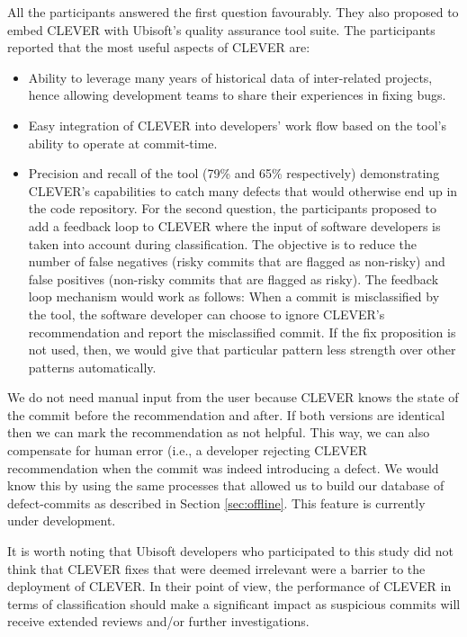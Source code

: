 \documentclass[sigconf]{acmart}
\providecommand{\tightlist}{%
  \setlength{\itemsep}{0pt}\setlength{\parskip}{0pt}}
\begin{document}
All the participants answered the first question favourably. They also
proposed to embed CLEVER with Ubisoft's quality assurance tool suite.
The participants reported that the most useful aspects of CLEVER are:

\begin{itemize}
\tightlist
\item
  Ability to leverage many years of historical data of inter-related
  projects, hence allowing development teams to share their experiences
  in fixing bugs.
\item
  Easy integration of CLEVER into developers' work flow based on the
  tool's ability to operate at commit-time.\\
\item
  Precision and recall of the tool (79\% and 65\% respectively)
  demonstrating CLEVER's capabilities to catch many defects that would
  otherwise end up in the code repository. For the second question, the
  participants proposed to add a feedback loop to CLEVER where the input
  of software developers is taken into account during classification.
  The objective is to reduce the number of false negatives (risky
  commits that are flagged as non-risky) and false positives (non-risky
  commits that are flagged as risky). The feedback loop mechanism would
  work as follows: When a commit is misclassified by the tool, the
  software developer can choose to ignore CLEVER's recommendation and
  report the misclassified commit. If the fix proposition is not used,
  then, we would give that particular pattern less strength over other
  patterns automatically.
\end{itemize}

We do not need manual input from the user because CLEVER knows the state
of the commit before the recommendation and after. If both versions are
identical then we can mark the recommendation as not helpful. This way,
we can also compensate for human error (i.e., a developer rejecting
CLEVER recommendation when the commit was indeed introducing a defect.
We would know this by using the same processes that allowed us to build
our database of defect-commits as described in Section
\ref{sec:offline}. This feature is currently under development.

It is worth noting that Ubisoft developers who participated to this
study did not think that CLEVER fixes that were deemed irrelevant were a
barrier to the deployment of CLEVER. In their point of view, the
performance of CLEVER in terms of classification should make a
significant impact as suspicious commits will receive extended reviews
and/or further investigations.
\end{document}
